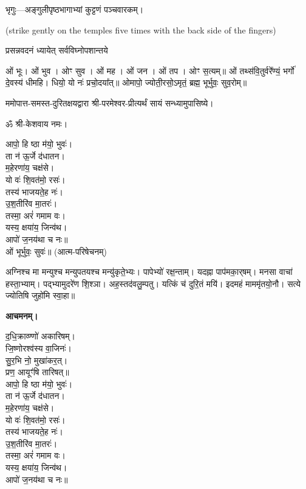 
भृगुः—अङ्गुलीपृष्ठभागाभ्यां कुट्टणं पञ्चवारकम्।

{\scriptsize (strike gently on the temples five times with the back side of the fingers)}

{प्रसन्नवदनं ध्यायेत् सर्वविघ्नोपशान्तये}


ओं भूः। ओं भुव। ओꣳ सुव। ओं मह। ओं जन। ओं तप। ओꣳ स॒त्यम्॥
ओं तथ्स॑वि॒तुर्वरे᳚ण्यं॒ भर्गो॑ दे॒वस्य॑ धीमहि। धियो॒ यो नः॑ प्रचो॒दया᳚त्॥
ओमापो॒ ज्योती॒रसो॒ऽमृतं॒ ब्रह्म॒ भूर्भुवः॒ सुव॒रोम्॥


ममोपात्त-समस्त-दुरितक्षयद्वारा श्री-परमेश्वर-प्रीत्यर्थं सायं सन्ध्यामुपासिष्ये।


ॐ श्री-केशवाय नमः।

आपो॒ हि ष्ठा म॑यो॒ भुवः॑।\\
ता न॑ ऊ॒र्जे द॑धातन।\\
म॒हेरणा॑य॒ चक्ष॑से।\\
यो वः॑ शि॒वत॑मो॒ रसः॑।\\
तस्य॑ भाजयते॒ह नः॑।\\
उ॒श॒तीरि॑व मा॒तरः॑।\\
तस्मा॒ अरं॑ गमाम वः।\\
यस्य॒ क्षया॑य॒ जिन्व॑थ।\\
आपो॑ ज॒नय॑था च नः॥\\

ओं भूर्भुवः॒ सुवः॑॥ (आत्म-परिषेचनम्)


अग्निश्च मा मन्युश्च मन्युपतयश्च मन्यु॑कृते॒भ्यः। पापेभ्यो॑ रक्ष॒न्ताम्। यदह्ना पाप॑मका॒र्‌षम्। मनसा वाचा॑ हस्ता॒भ्याम्। पद्भ्यामुदरे॑ण शि॒श्ञा। अह॒स्तद॑वलु॒म्पतु। यत्किं च॑ दुरि॒तं मयि॑। इदमहं माममृ॑तयो॒नौ। सत्ये ज्योतिषि जुहो॑मि स्वा॒हा॥


\textbf{आचमनम्।}

द॒धि॒क्राव्ण्णो॑ अकारिषम्।\\
 जि॒ष्णोरश्व॑स्य वा॒जिनः॑।\\
सु॒र॒भि नो॒ मुखा॑कर॒त्।\\
प्रण॒ आयूꣳ॑षि तारिषत्॥\\



आपो॒ हि ष्ठा म॑यो॒ भुवः॑।\\
ता न॑ ऊ॒र्जे द॑धातन।\\
म॒हेरणा॑य॒ चक्ष॑से।\\
यो वः॑ शि॒वत॑मो॒ रसः॑।\\
तस्य॑ भाजयते॒ह नः॑।\\
उ॒श॒तीरि॑व मा॒तरः॑।\\
तस्मा॒ अरं॑ गमाम वः।\\
यस्य॒ क्षया॑य॒ जिन्व॑थ।\\
आपो॑ ज॒नय॑था च नः॥\\

